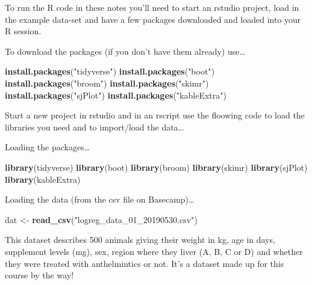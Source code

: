 \documentclass[]{tufte-handout}
\newenvironment{Shaded}{}{}
\newcommand{\KeywordTok}[1]{\textcolor[rgb]{0.00,0.44,0.13}{\textbf{#1}}}
\newcommand{\NormalTok}[1]{#1}
\newcommand{\StringTok}[1]{\textcolor[rgb]{0.25,0.44,0.63}{#1}}
\begin{document}
To run the R code in these notes you'll need to start an rstudio
project, load in the example data-set and have a few packages downloaded
and loaded into your R session.

To download the packages (if you don't have them already) use\ldots{}

\begin{Shaded}
\begin{Highlighting}[]
\KeywordTok{install.packages}\NormalTok{(}\StringTok{"tidyverse"}\NormalTok{)}
\KeywordTok{install.packages}\NormalTok{(}\StringTok{"boot"}\NormalTok{)}
\KeywordTok{install.packages}\NormalTok{(}\StringTok{"broom"}\NormalTok{)}
\KeywordTok{install.packages}\NormalTok{(}\StringTok{"skimr"}\NormalTok{)}
\KeywordTok{install.packages}\NormalTok{(}\StringTok{"sjPlot"}\NormalTok{)}
\KeywordTok{install.packages}\NormalTok{(}\StringTok{"kableExtra"}\NormalTok{)}
\end{Highlighting}
\end{Shaded}

Start a new project in rstudio and in an rscript use the floowing code
to load the libraries you need and to import/load the data\ldots{}

Loading the packages\ldots{}

\begin{Shaded}
\begin{Highlighting}[]
\KeywordTok{library}\NormalTok{(tidyverse)}
\KeywordTok{library}\NormalTok{(boot)}
\KeywordTok{library}\NormalTok{(broom)}
\KeywordTok{library}\NormalTok{(skimr)}
\KeywordTok{library}\NormalTok{(sjPlot)}
\KeywordTok{library}\NormalTok{(kableExtra)}
\end{Highlighting}
\end{Shaded}

Loading the data (from the csv file on Basecamp)\ldots{}

\begin{Shaded}
\begin{Highlighting}[]
\NormalTok{dat <-}\StringTok{ }\KeywordTok{read_csv}\NormalTok{(}\StringTok{"logreg_data_01_20190530.csv"}\NormalTok{)}
\end{Highlighting}
\end{Shaded}

This dataset describes 500 animals giving their weight in kg, age in
days, supplement levels (mg), sex, region where they liver (A, B, C or
D) and whether they were treated with anthelmintics or not. It's a
dataset made up for this course by the way!
\end{document}
